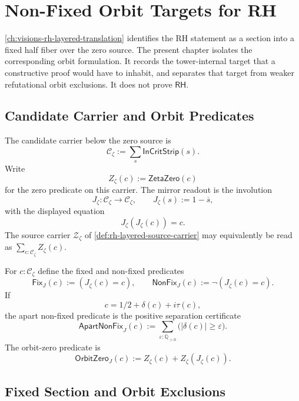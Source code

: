 \chapter{Non-Fixed Orbit Targets for RH}
\label{ch:visions-rh-nonfixed-orbit-targets}

\autoref{ch:visions-rh-layered-translation} identifies the RH statement as
a section into a fixed half fiber over the zero source. The present chapter
isolates the corresponding orbit formulation. It records the tower-internal
target that a constructive proof would have to inhabit, and separates that
target from weaker refutational orbit exclusions. It does not prove
$\mathsf{RH}$.

\section{Candidate Carrier and Orbit Predicates}
\label{sec:rh-nonfixed-candidate-orbit-predicates}

\begin{definition}
\label{def:rh-layered-critical-strip-candidate-carrier}
The candidate carrier below the zero source is
$$
\mathcal C_{\zeta}
:=
\sum_s\mathsf{InCritStrip}(s).
$$
Write
$$
Z_{\zeta}(c):=\mathsf{ZetaZero}(c)
$$
for the zero predicate on this carrier. The mirror readout is the
involution
$$
J_{\zeta}:\mathcal C_{\zeta}\to\mathcal C_{\zeta},
\qquad
J_{\zeta}(s):=1-\overline{s},
$$
with the displayed equation
$$
J_{\zeta}(J_{\zeta}(c))=c.
$$
The source carrier $\mathcal Z_{\zeta}$ of
\autoref{def:rh-layered-source-carrier} may equivalently be read as
$\sum_{c:\mathcal C_{\zeta}}Z_{\zeta}(c)$.
\end{definition}

\begin{definition}
\label{def:rh-layered-mirror-orbit-predicates}
For $c:\mathcal C_{\zeta}$ define the fixed and non-fixed predicates
$$
\mathsf{Fix}_{J}(c):=(J_{\zeta}(c)=c),
\qquad
\mathsf{NonFix}_{J}(c):=\neg(J_{\zeta}(c)=c).
$$
If
$$
c=1/2+\delta(c)+i\tau(c),
$$
the apart non-fixed predicate is the positive separation certificate
$$
\mathsf{ApartNonFix}_{J}(c)
:=
\sum_{\varepsilon:\mathbb Q_{>0}}
\bigl(|\delta(c)|\ge\varepsilon\bigr).
$$
The orbit-zero predicate is
$$
\mathsf{OrbitZero}_{J}(c)
:=
Z_{\zeta}(c)+Z_{\zeta}(J_{\zeta}(c)).
$$
\end{definition}

\section{Fixed Section and Orbit Exclusions}
\label{sec:rh-nonfixed-fixed-section-exclusions}


